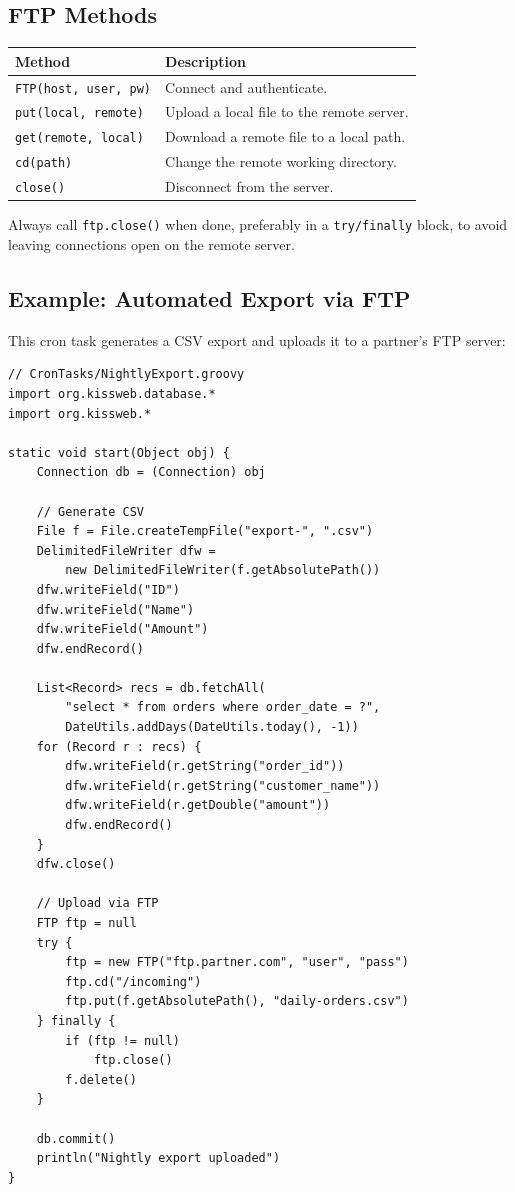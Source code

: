 \subsection{FTP Methods}

\begin{longtable}{P{4.8cm}P{5.7cm}}
\toprule
\textbf{Method} & \textbf{Description} \\
\midrule
\endhead
\texttt{FTP(host, user, pw)} & Connect and authenticate. \\
\texttt{put(local, remote)} & Upload a local file to the remote server. \\
\texttt{get(remote, local)} & Download a remote file to a local path. \\
\texttt{cd(path)} & Change the remote working directory. \\
\texttt{close()} & Disconnect from the server. \\
\bottomrule
\end{longtable}

\begin{warnbox}
Always call \texttt{ftp.close()} when done, preferably in a \texttt{try/finally} block, to avoid leaving connections open on the remote server.
\end{warnbox}

\subsection{Example: Automated Export via FTP}

This cron task generates a CSV export and uploads it to a partner's FTP server:

\begin{lstlisting}[style=groovy]
// CronTasks/NightlyExport.groovy
import org.kissweb.database.*
import org.kissweb.*

static void start(Object obj) {
    Connection db = (Connection) obj

    // Generate CSV
    File f = File.createTempFile("export-", ".csv")
    DelimitedFileWriter dfw =
        new DelimitedFileWriter(f.getAbsolutePath())
    dfw.writeField("ID")
    dfw.writeField("Name")
    dfw.writeField("Amount")
    dfw.endRecord()

    List<Record> recs = db.fetchAll(
        "select * from orders where order_date = ?",
        DateUtils.addDays(DateUtils.today(), -1))
    for (Record r : recs) {
        dfw.writeField(r.getString("order_id"))
        dfw.writeField(r.getString("customer_name"))
        dfw.writeField(r.getDouble("amount"))
        dfw.endRecord()
    }
    dfw.close()

    // Upload via FTP
    FTP ftp = null
    try {
        ftp = new FTP("ftp.partner.com", "user", "pass")
        ftp.cd("/incoming")
        ftp.put(f.getAbsolutePath(), "daily-orders.csv")
    } finally {
        if (ftp != null)
            ftp.close()
        f.delete()
    }

    db.commit()
    println("Nightly export uploaded")
}
\end{lstlisting}

